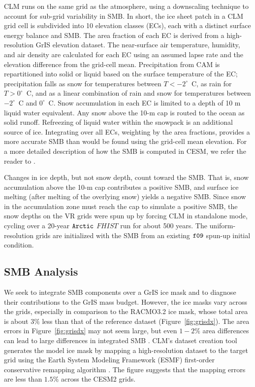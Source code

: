 \documentclass[draft]{agujournal2019}
\begin{document}
CLM runs on the same grid as the atmosphere, using a downscaling technique to account for sub-grid variability in SMB. In short, the ice sheet patch in a CLM grid cell is subdivided into 10 elevation classes (ECs), each with a distinct surface energy balance and SMB. The area fraction of each EC is derived from a high-resolution GrIS elevation dataset. The near-surface air temperature, humidity, and air density are calculated for each EC using an assumed lapse rate and the elevation difference from the grid-cell mean. Precipitation from CAM is repartitioned into solid or liquid based on the surface temperature of the EC; precipitation falls as snow for temperatures between $T < -2^\circ$~C, as rain for $T > 0^\circ$~C,  and as a linear combination of rain and snow for temperatures between $-2^\circ$~C and $0^\circ$~C.
Snow accumulation in each EC is limited to a depth of 10 m liquid water equivalent. Any snow above the 10-m cap is routed to the ocean as solid runoff.  Refreezing of liquid water within the snowpack is an additional source of ice.  Integrating over all ECs, weighting by the area fractions, provides a more accurate SMB than would be found using the grid-cell mean elevation. For a more detailed description of how the SMB is computed in CESM, we refer the reader to . {\color{orange}{Marcus - mention you're not running CISM.}}

Changes in ice depth, but not snow depth, count toward the SMB.  That is, snow accumulation above the 10-m cap contributes a positive SMB, and surface ice melting (after melting of the overlying snow) yields a negative SMB.  Since snow in the accumulation zone must reach the cap to simulate a positive SMB, the snow depths on the VR grids were spun up by forcing CLM in standalone mode, cycling over a 20-year $\tt Arctic$ $FHIST$ run for about 500 years. The uniform-resolution grids are initialized with the SMB from an existing $\tt f09$ spun-up initial condition.

\subsection{SMB Analysis}\label{sec:SMB}

We seek to integrate SMB components over a GrIS ice mask and to diagnose their contributions to the GrIS mass budget. However, the ice masks vary across the grids, especially in comparison to the RACMO3.2 ice mask, whose total area is about $3\%$ less than that of the reference dataset (Figure~\ref{fig:grisdx}). The area errors in Figure~\ref{fig:grisdx} may not seem large, but even $1-2\%$ area differences can lead to large differences in integrated SMB \cite{HETAL2022TC}. CLM's dataset creation tool generates the model ice mask by mapping a high-resolution dataset to the target grid using the Earth System Modeling Framework (ESMF) first-order conservative remapping algorithm \cite{ESMF}. The figure suggests that the mapping errors are less than $1.5\%$ across the CESM2 grids.
\end{document}
